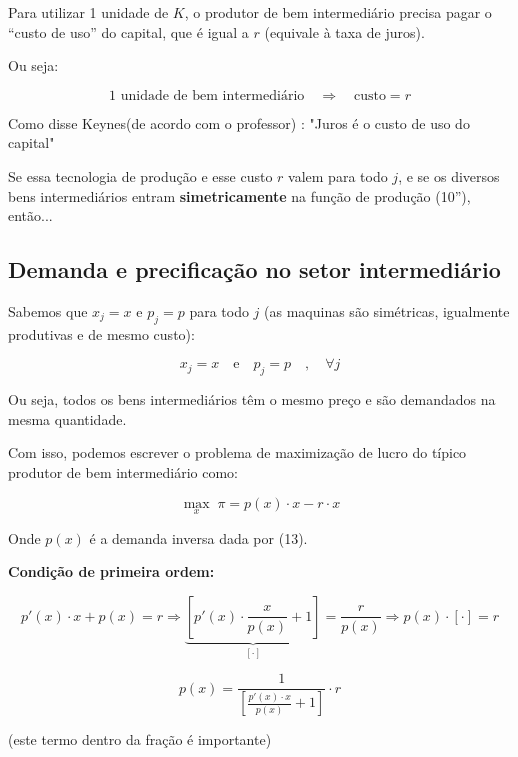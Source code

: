 \documentclass[a4paper,12pt]{article}[abntex2]
\begin{document}
Para utilizar 1 unidade de $K$, o produtor de bem intermediário precisa pagar o ``custo de uso'' do capital, que é igual a $r$ (equivale à taxa de juros).

Ou seja:

\[
1 \text{ unidade de bem intermediário} \quad \Rightarrow \quad \text{custo} = r 
\]

Como disse Keynes(de acordo com o professor) : "Juros é o custo de uso do capital"

Se essa tecnologia de produção e esse custo $r$ valem para todo $j$, e se os diversos bens intermediários entram \textbf{simetricamente} na função de produção (10''), então...

\subsection{\textbf{Demanda e precificação no setor intermediário}}

Sabemos que $x_j = x$ e $p_j = p$ para todo $j$ (as maquinas são simétricas, igualmente produtivas e de mesmo custo):

\begin{equation}
x_j = x \quad \text{e} \quad p_j = p \quad , \quad \forall j \tag{14}
\end{equation}

Ou seja, todos os bens intermediários têm o mesmo preço e são demandados na mesma quantidade. 

Com isso, podemos escrever o problema de maximização de lucro do típico produtor de bem intermediário como:

\begin{equation}
\max_{x} \; \pi = p(x) \cdot x - r \cdot x \tag{15}
\end{equation}

Onde $p(x)$ é a demanda inversa dada por (13).

\vspace{0.2cm}
\noindent\textbf{Condição de primeira ordem:}

\[
p'(x) \cdot x + p(x) = r
\Rightarrow \underbrace{\left[ p'(x) \cdot \frac{x}{p(x)} + 1 \right]}_{[\cdot]} = \frac{r}{p(x)}
\Rightarrow p(x) \cdot \left[ \cdot \right] = r
\]

\begin{equation}
p(x) = \frac{1}{\left[ \frac{p'(x) \cdot x}{p(x)} + 1 \right]} \cdot r \tag{16}
\end{equation}

\hfill (este termo dentro da fração é importante)
\end{document}

